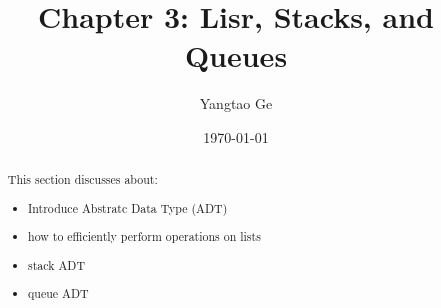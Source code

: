 \documentclass[12pt]{article}
\title{Chapter 3: Lisr, Stacks, and Queues}
\author{Yangtao Ge}
\date{\today}
\theoremstyle{definition}
\begin{document}
\maketitle
\begin{abstract}
This section discusses about:
\begin{itemize}
    \item Introduce Abstratc Data Type (ADT)
    \item how to efficiently perform operations on lists 
    \item stack ADT
    \item queue ADT
\end{itemize}
\end{abstract}
\end{document}
